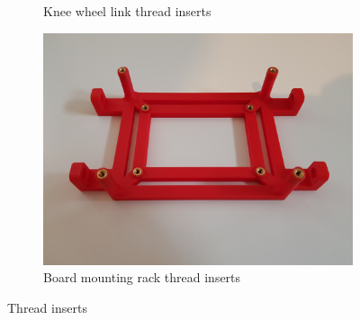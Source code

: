 \begin{figure}[h]
\begin{subfigure}[t]{0.3\textwidth}
		\caption{Knee wheel link thread inserts}
		\label{fig:kneewheellinkthreadinserts}
	\end{subfigure}
	\begin{subfigure}[t]{0.3\textwidth}
		\centering
		\includegraphics[height=0.7\textwidth]{board_mounting_rack_thread_inserts}
		\caption{Board mounting rack thread inserts}
		\label{fig:boardmountingrackthreadinserts}
	\end{subfigure}
	\caption{Thread inserts}
	\label{fig:Thread inserts}
\end{figure}


